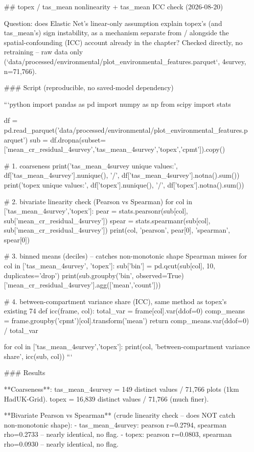 ## topex / tas_mean nonlinearity + tas_mean ICC check (2026-08-20)

Question: does Elastic Net's linear-only assumption explain topex's (and tas_mean's) sign
instability, as a mechanism separate from / alongside the spatial-confounding (ICC) account
already in the chapter? Checked directly, no retraining -- raw data only
(`data/processed/environmental/plot_environmental_features.parquet`, 4survey, n=71,766).

### Script (reproducible, no saved-model dependency)

```python
import pandas as pd
import numpy as np
from scipy import stats

df = pd.read_parquet('data/processed/environmental/plot_environmental_features.parquet')
sub = df.dropna(subset=['mean_cr_residual_4survey','tas_mean_4survey','topex','cpmt']).copy()

# 1. coarseness
print('tas_mean_4survey unique values:', df['tas_mean_4survey'].nunique(), '/', df['tas_mean_4survey'].notna().sum())
print('topex unique values:', df['topex'].nunique(), '/', df['topex'].notna().sum())

# 2. bivariate linearity check (Pearson vs Spearman)
for col in ['tas_mean_4survey','topex']:
    pear = stats.pearsonr(sub[col], sub['mean_cr_residual_4survey'])
    spear = stats.spearmanr(sub[col], sub['mean_cr_residual_4survey'])
    print(col, 'pearson', pear[0], 'spearman', spear[0])

# 3. binned means (deciles) -- catches non-monotonic shape Spearman misses
for col in ['tas_mean_4survey', 'topex']:
    sub['bin'] = pd.qcut(sub[col], 10, duplicates='drop')
    print(sub.groupby('bin', observed=True)['mean_cr_residual_4survey'].agg(['mean','count']))

# 4. between-compartment variance share (ICC), same method as topex's existing 74%
def icc(frame, col):
    total_var = frame[col].var(ddof=0)
    comp_means = frame.groupby('cpmt')[col].transform('mean')
    return comp_means.var(ddof=0) / total_var

for col in ['tas_mean_4survey','topex']:
    print(col, 'between-compartment variance share', icc(sub, col))
```

### Results

**Coarseness**: tas_mean_4survey = 149 distinct values / 71,766 plots (1km HadUK-Grid).
topex = 16,839 distinct values / 71,766 (much finer).

**Bivariate Pearson vs Spearman** (crude linearity check -- does NOT catch non-monotonic shape):
- tas_mean_4survey: pearson r=0.2794, spearman rho=0.2733 -- nearly identical, no flag.
- topex: pearson r=0.0803, spearman rho=0.0930 -- nearly identical, no flag.

